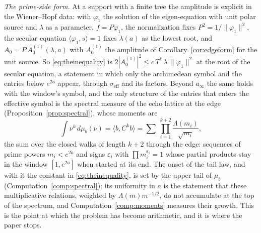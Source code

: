\documentclass[11pt]{article}
\theoremstyle{definition}
\theoremstyle{remark}
\newcommand{\Tst}{T^{*}}
\begin{document}
\emph{The prime-side form.} At a support with a finite tree the amplitude is explicit in the Wiener--Hopf data: with $\varphi_1$ the solution of the eigen-equation with unit polar source and $\lambda$ as a parameter, $f=P\varphi_1$, the normalization fixes $P^2=1/\|\varphi_1\|^2$, the secular equation $\langle\varphi_1,s\rangle=1$ fixes $\lambda(a)$ as the lowest root, and $A_0=P\,A_0^{(1)}(\lambda,a)$ with $A_0^{(1)}$ the amplitude of Corollary~\ref{cor:edgeform} for the unit source. So \eqref{eq:theinequality} is $2|A_0^{(1)}|^2\le c\,\Tst\,\lambda\,\|\varphi_1\|^2$ at the root of the secular equation, a statement in which only the archimedean symbol and the entries below $e^{2a}$ appear, through $\sigma_{\mathrm{eff}}$ and its factors. Beyond $a_\infty$ the same holds with the window's symbol, and the only structure of the entries that enters the effective symbol is the spectral measure of the echo lattice at the edge (Proposition~\ref{prop:spectral}), whose moments are
\begin{equation}\label{eq:moments}
\int\nu^k\,d\mu_b(\nu)=\langle b,C^kb\rangle=\sum\ \prod_{i=1}^{k+2}\frac{\Lambda(m_i)}{\sqrt{m_i}},
\end{equation}
the sum over the closed walks of length $k+2$ through the edge: sequences of prime powers $m_i<e^{2a}$ and signs $\varepsilon_i$ with $\prod m_i^{\varepsilon_i}=1$ whose partial products stay in the window $[1,e^{2a}]$ when started at its end. The onset of the tail law, and with it the constant in \eqref{eq:theinequality}, is set by the upper tail of $\mu_b$ (Computation~\ref{comp:spectral}); its uniformity in $a$ is the statement that these multiplicative relations, weighted by $\Lambda(m)m^{-1/2}$, do not accumulate at the top of the spectrum, and Computation~\ref{comp:moments} measures their growth. This is the point at which the problem has become arithmetic, and it is where the paper stops.
\end{document}
